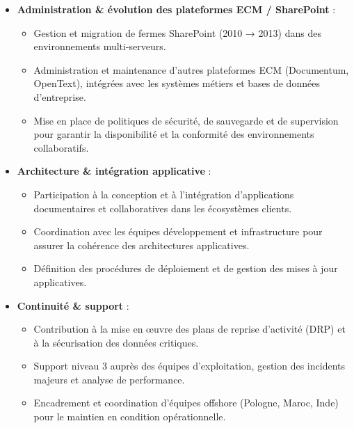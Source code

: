 \begin{experiences}
{\begin{itemize}[left=0pt,label={},itemsep=0.4em]
          \item \textbf{Administration \& évolution des plateformes ECM / SharePoint} :
            \begin{itemize}[itemsep=0.15em,topsep=0.1em,parsep=0pt]
              \small
              \item Gestion et migration de fermes SharePoint (2010 → 2013) dans des environnements multi-serveurs.
              \item Administration et maintenance d’autres plateformes ECM (Documentum, OpenText), intégrées avec les systèmes métiers et bases de données d’entreprise.
              \item Mise en place de politiques de sécurité, de sauvegarde et de supervision pour garantir la disponibilité et la conformité des environnements collaboratifs.
            \end{itemize}

          \vspace{0.2em}

          \item \textbf{Architecture \& intégration applicative} :
            \begin{itemize}[itemsep=0.15em,topsep=0.1em,parsep=0pt]
              \small
              \item Participation à la conception et à l’intégration d’applications documentaires et collaboratives dans les écosystèmes clients.
              \item Coordination avec les équipes développement et infrastructure pour assurer la cohérence des architectures applicatives.
              \item Définition des procédures de déploiement et de gestion des mises à jour applicatives.
            \end{itemize}

          \vspace{0.2em}

          \item \textbf{Continuité \& support} :
            \begin{itemize}[itemsep=0.15em,topsep=0.1em,parsep=0pt]
              \small
              \item Contribution à la mise en œuvre des plans de reprise d’activité (DRP) et à la sécurisation des données critiques.
              \item Support niveau 3 auprès des équipes d’exploitation, gestion des incidents majeurs et analyse de performance.
              \item Encadrement et coordination d’équipes offshore (Pologne, Maroc, Inde) pour le maintien en condition opérationnelle.
            \end{itemize}


\end{itemize}}
\end{experiences}
